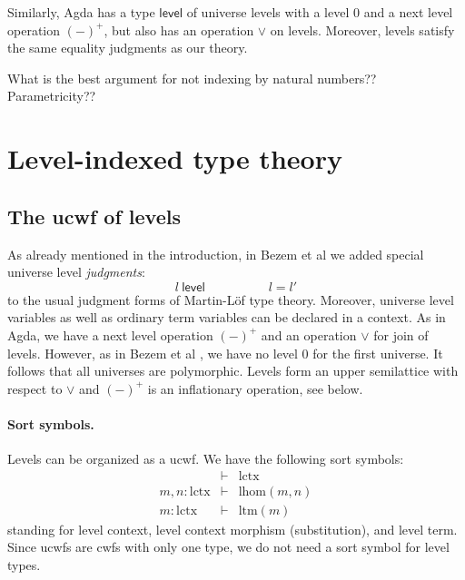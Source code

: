 \documentclass[11pt,a4paper]{article}
\theoremstyle{definition}
\newcommand{\Level}{\mathsf{level}}
\newcommand{\level}{\mathsf{level}}
\def\lHom{\mathrm{lhom}}
\def\lctx{\mathrm{lctx}}
\def\ltm{\mathrm{ltm}}
\begin{document}
Similarly, Agda has a type $\Level$ of universe levels with a level 0 and a next level operation $(-)^+$, but also has an operation $\vee$ on levels. Moreover, levels satisfy the same equality judgments as our theory.

What is the best argument for not indexing by natural numbers?? Parametricity??

\section{Level-indexed type theory}

\subsection{The ucwf of levels} As already mentioned in the introduction, in Bezem et al \cite{BezemCDE22} we added special universe level {\em judgments}:
$$
l\ \level
\hspace{5em}
l = l'
$$
to the usual judgment forms of Martin-Löf type theory. Moreover, universe level variables as well as ordinary term variables can be declared in a context. As in Agda, we have a next level operation $(-)^+$ and an operation $\vee$ for join of levels. However, as in Bezem et al \cite{BezemCDE22}, we have no level 0 for the first universe. It follows that all universes are polymorphic.
Levels form an upper semilattice with respect to $\vee$ and $(-)^+$ is an inflationary operation, see below.

\paragraph{Sort symbols.} Levels can be organized as a ucwf. We have the following sort symbols:
\begin{eqnarray*}
&\vdash& \lctx\\
m, n : \lctx &\vdash& \lHom(m,n)\\
m : \lctx &\vdash& \ltm(m)
\end{eqnarray*}
standing for level context, level context morphism (substitution), and level term.
Since ucwfs are cwfs with only one type, we do not need a sort symbol for level types. 
\end{document}
